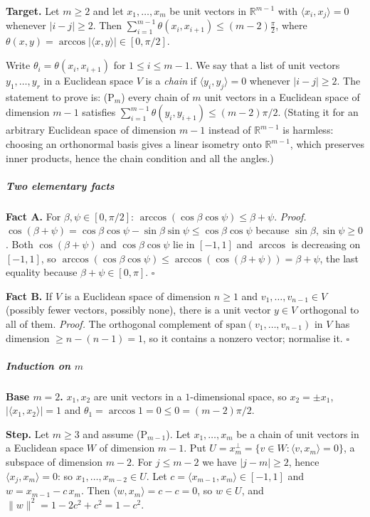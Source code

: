 \documentclass[11pt,a4paper]{article}
\begin{document}
\textbf{Target.} Let \(m\ge2\) and let \(x_1,\dots,x_m\) be unit vectors
in \(\mathbb R^{m-1}\) with \(\langle x_i,x_j\rangle=0\) whenever
\(|i-j|\ge2\). Then
\(\sum_{i=1}^{m-1}\theta(x_i,x_{i+1})\le(m-2)\frac{\pi}{2}\), where
\(\theta(x,y)=\arccos|\langle x,y\rangle|\in[0,\pi/2]\).

Write \(\theta_i=\theta(x_i,x_{i+1})\) for \(1\le i\le m-1\). We say
that a list of unit vectors \(y_1,\dots,y_r\) in a Euclidean space \(V\)
is a \emph{chain} if \(\langle y_i,y_j\rangle=0\) whenever
\(|i-j|\ge2\). The statement to prove is: (P\(_m\)) every chain of \(m\)
unit vectors in a Euclidean space of dimension \(m-1\) satisfies
\(\sum_{i=1}^{m-1}\theta(y_i,y_{i+1})\le(m-2)\pi/2\). (Stating it for an
arbitrary Euclidean space of dimension \(m-1\) instead of
\(\mathbb R^{m-1}\) is harmless: choosing an orthonormal basis gives a
linear isometry onto \(\mathbb R^{m-1}\), which preserves inner
products, hence the chain condition and all the angles.)

\subparagraph{Two elementary facts}\label{two-elementary-facts}

\textbf{Fact A.} For \(\beta,\psi\in[0,\pi/2]\):
\(\arccos(\cos\beta\cos\psi)\le\beta+\psi\). \emph{Proof.}
\(\cos(\beta+\psi)=\cos\beta\cos\psi-\sin\beta\sin\psi\le\cos\beta\cos\psi\)
because \(\sin\beta,\sin\psi\ge0\). Both \(\cos(\beta+\psi)\) and
\(\cos\beta\cos\psi\) lie in \([-1,1]\) and \(\arccos\) is decreasing on
\([-1,1]\), so
\(\arccos(\cos\beta\cos\psi)\le\arccos(\cos(\beta+\psi))=\beta+\psi\),
the last equality because \(\beta+\psi\in[0,\pi]\). \(\square\)

\textbf{Fact B.} If \(V\) is a Euclidean space of dimension \(n\ge1\)
and \(v_1,\dots,v_{n-1}\in V\) (possibly fewer vectors, possibly none),
there is a unit vector \(y\in V\) orthogonal to all of them.
\emph{Proof.} The orthogonal complement of
\(\mathrm{span}(v_1,\dots,v_{n-1})\) in \(V\) has dimension
\(\ge n-(n-1)=1\), so it contains a nonzero vector; normalise it.
\(\square\)

\subparagraph{\texorpdfstring{Induction on
\(m\)}{Induction on m}}\label{induction-on-m}

\textbf{Base \(m=2\).} \(x_1,x_2\) are unit vectors in a
\(1\)-dimensional space, so \(x_2=\pm x_1\),
\(|\langle x_1,x_2\rangle|=1\) and
\(\theta_1=\arccos 1=0\le0=(m-2)\pi/2\).

\textbf{Step.} Let \(m\ge3\) and assume (P\(_{m-1}\)). Let
\(x_1,\dots,x_m\) be a chain of unit vectors in a Euclidean space \(W\)
of dimension \(m-1\). Put
\(U=x_m^{\perp}=\{v\in W:\langle v,x_m\rangle=0\}\), a subspace of
dimension \(m-2\). For \(j\le m-2\) we have \(|j-m|\ge2\), hence
\(\langle x_j,x_m\rangle=0\): so \(x_1,\dots,x_{m-2}\in U\). Let
\(c=\langle x_{m-1},x_m\rangle\in[-1,1]\) and \(w=x_{m-1}-c\,x_m\). Then
\(\langle w,x_m\rangle=c-c=0\), so \(w\in U\), and
\(\|w\|^2=1-2c^2+c^2=1-c^2\).
\end{document}
